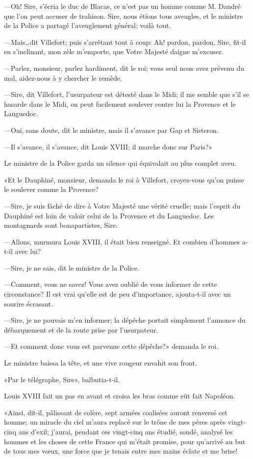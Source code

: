 —Oh! Sire, s'écria le duc de Blacas, ce n'est pas un homme comme M. Dandré que l'on peut accuser de trahison. Sire, nous étions tous aveugles, et le ministre de la Police a partagé l'aveuglement général; voilà tout.

—Mais\dots dit Villefort; puis s'arrêtant tout à coup: Ah! pardon, pardon, Sire, fit-il en s'inclinant, mon zèle m'emporte, que Votre Majesté daigne m'excuser.

—Parlez, monsieur, parlez hardiment, dit le roi; vous seul nous avez prévenu du mal, aidez-nous à y chercher le remède.

—Sire, dit Villefort, l'usurpateur est détesté dans le Midi; il me semble que s'il se hasarde dans le Midi, on peut facilement soulever contre lui la Provence et le Languedoc.

—Oui, sans doute, dit le ministre, mais il s'avance par Gap et Sisteron.

—Il s'avance, il s'avance, dit Louis XVIII; il marche donc sur Paris?»

Le ministre de la Police garda un silence qui équivalait au plus complet aveu.

«Et le Dauphiné, monsieur, demanda le roi à Villefort, croyez-vous qu'on puisse le soulever comme la Provence?

—Sire, je suis fâché de dire à Votre Majesté une vérité cruelle; mais l'esprit du Dauphiné est loin de valoir celui de la Provence et du Languedoc. Les montagnards sont bonapartistes, Sire.

—Allons, murmura Louis XVIII, il était bien renseigné. Et combien d'hommes a-t-il avec lui?

—Sire, je ne sais, dit le ministre de la Police.

—Comment, vous ne savez! Vous avez oublié de vous informer de cette circonstance? Il est vrai qu'elle est de peu d'importance, ajouta-t-il avec un sourire écrasant.

—Sire, je ne pouvais m'en informer; la dépêche portait simplement l'annonce du débarquement et de la route prise par l'usurpateur.

—Et comment donc vous est parvenue cette dépêche?» demanda le roi.

Le ministre baissa la tête, et une vive rougeur envahit son front.

«Par le télégraphe, Sire», balbutia-t-il.

Louis XVIII fait un pas en avant et croisa les bras comme eût fait Napoléon.

«Ainsi, dit-il, pâlissant de colère, sept armées coalisées auront renversé cet homme; un miracle du ciel m'aura replacé sur le trône de mes pères après vingt-cinq ans d'exil; j'aurai, pendant ces vingt-cinq ans étudié, sondé, analysé les hommes et les choses de cette France qui m'était promise, pour qu'arrivé au but de tous mes vœux, une force que je tenais entre mes mains éclate et me brise!


